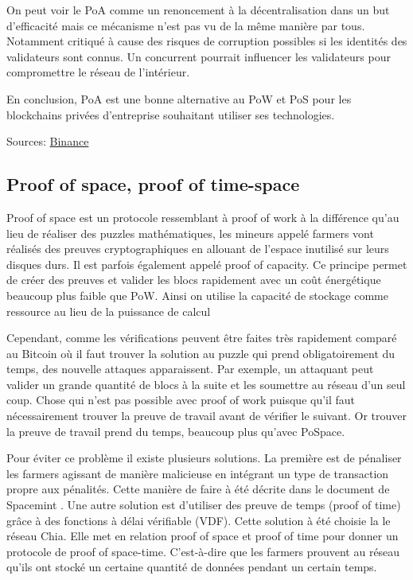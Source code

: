 On peut voir le PoA comme un renoncement à la décentralisation dans un but d'efficacité mais ce mécanisme n'est pas vu de la même manière par tous. Notamment critiqué à cause des risques de corruption possibles si les identités des validateurs sont connus. Un concurrent pourrait influencer les validateurs pour compromettre le réseau de l'intérieur.

En conclusion, PoA est une bonne alternative au PoW et PoS pour les blockchains privées d'entreprise souhaitant utiliser ses technologies.

Sources: \href{https://academy.binance.com/fr/articles/proof-of-authority-explained}{Binance}

\subsection{Proof of space, proof of time-space}

Proof of space est un protocole ressemblant à proof of work à la différence qu'au lieu de réaliser des puzzles mathématiques, les mineurs appelé farmers vont réalisés des preuves cryptographiques en allouant de l'espace inutilisé sur leurs disques durs. Il est parfois également appelé proof of capacity. Ce principe permet de créer des preuves et valider les blocs rapidement avec un coût énergétique beaucoup plus faible que PoW. Ainsi on utilise la capacité de stockage comme ressource au lieu de la puissance de calcul

Cependant, comme les vérifications peuvent être faites très rapidement comparé au Bitcoin où il faut trouver la solution au puzzle qui prend obligatoirement du temps, des nouvelle attaques apparaissent. Par exemple, un attaquant peut valider un grande quantité de blocs à la suite et les soumettre au réseau d'un seul coup. Chose qui n'est pas possible avec proof of work puisque qu'il faut nécessairement trouver la preuve de travail avant de vérifier le suivant. Or trouver la preuve de travail prend du temps, beaucoup plus qu'avec PoSpace. 

Pour éviter ce problème il existe plusieurs solutions. La première est de pénaliser les farmers agissant de manière malicieuse en intégrant un type de transaction propre aux pénalités. Cette manière de faire à été décrite dans le document de Spacemint \cite{DBLP:conf/fc/ParkKFGAP18}. Une autre solution est d'utiliser des preuve de temps (proof of time) grâce à des fonctions à délai vérifiable (VDF). Cette solution à été choisie la le réseau Chia. Elle met en relation proof of space et proof of time pour donner un protocole de proof of space-time. C'est-à-dire que les farmers prouvent au réseau qu'ils ont stocké un certaine quantité de données pendant un certain temps.

